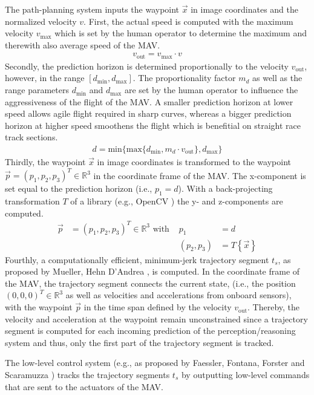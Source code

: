 The path-planning system inputs the waypoint $\vec x$ in image coordinates and the normalized velocity $v$.
First, the actual speed is computed with the maximum velocity $v_{\text{max}}$ which is set by the human operator 
to determine the maximum and therewith also average speed of the MAV.
\begin{align}
    v_{\text{out}} = v_{\text{max}} \cdot v
\end{align}
Secondly, the prediction horizon is determined proportionally to the velocity $v_{\text{out}}$,
however, in the range $[d_\text{min}, d_\text{max}]$.
The proportionality factor $m_d$ as well as the range parameters $d_\text{min}$ and $d_\text{max}$
are set by the human operator to influence the aggressiveness of the flight of the MAV.
A smaller prediction horizon at lower speed allows agile flight required in sharp curves,
whereas a bigger prediction horizon at higher speed smoothens the flight which is benefitial on straight race track sections.
\begin{align}
    d = \text{min} \{\text{max}\{d_\text{min}, m_d \cdot v_{\text{out}}\}, d_\text{max}\} 
\end{align}
Thirdly, the waypoint $\vec x$ in image coordinates 
is transformed to the waypoint $\vec p = (p_1, p_2, p_3)^T \in \mathbb{R}^3$ in the coordinate frame of the MAV.
The x-component is set equal to the prediction horizon (i.e., $p_1 = d$).
With a back-projecting transformation $T$ of a library (e.g., OpenCV \cite{OpenCV}) the y- and z-components are computed.
\begin{align}
    \vec p &= (p_1, p_2, p_3)^T \in \mathbb{R}^3 \text{ with } & p_1 &= d \nonumber \\
    && (p_2,  p_3)  & = T\left\{ \vec x\right\}
\end{align}
Fourthly, a computationally efficient, minimum-jerk trajectory segment $t_s$, 
as proposed by Mueller, Hehn D'Andrea \cite{Mueller2013}, is computed.
In the coordinate frame of the MAV, the trajectory segment connects the current state, 
(i.e., the position $(0, 0, 0)^T \in \mathbb{R}^3$ as well as velocities and accelerations from onboard sensors),
with the waypoint $\vec p$ in the time span defined by the velocity $v_\text{out}$.
Thereby, the velocity and acceleration at the waypoint remain unconstrained since 
a trajectory segment is computed for each incoming prediction of the perception/reasoning system
and thus, only the first part of the trajectory segment is tracked.

The low-level control system (e.g., as proposed by Faessler, Fontana, Forster and Scaramuzza \cite{Faessler2015}) 
tracks the trajectory segments $t_s$ by outputting low-level commands that are sent to the actuators of the MAV.

